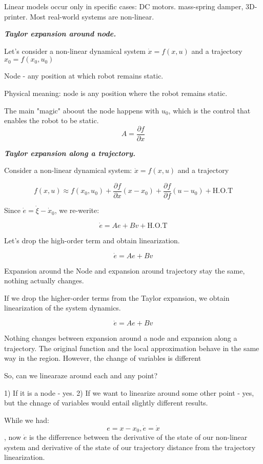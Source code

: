 Linear models occur only in specific cases: DC motors. mass-spring damper, 3D-printer.
Most real-world systems are non-linear. 

\textit{\textbf{Taylor expansion around node.}}

Let's consider a non-linear dynamical system $\dot x = f(x, u)$ and a trajectory $x_0 = f(x_0, u_0)$

Node - any position at which robot remains static. 

Physical meaning: node is any position where the robot remains static.

The main "magic" aboout the node happens with $u_0$, which is the control that enables the robot to be static. 
\[A = \dfrac{\partial f}{\partial x}\]



\textit{\textbf{Taylor expansion along a trajectory.}}

Consider a non-linear dynamical system:
$\dot  x = f(x, u)$ and a trajectory

\[f(x, u) \approx f(x_0, u_0) + \dfrac{\partial f}{\partial x} (x - x_0) + \dfrac{\partial f}{\partial f} (u - u_0) + \text{H.O.T}\]

Since $\dot e = \dot \xi - \dot x_0$, we re-werite:

\[\dot e = Ae + Bv + \text{H.O.T}\]

Let's drop the high-order term and obtain linearization. 

\[\dot e = Ae + Bv\]

Expansion around the Node and expansion around trajectory stay the same, nothing actually changes. 



If we drop the higher-order terms from the Taylor expansion, we obtain linearization of the system dynamics. 

\[\dot e = Ae + Bv\]

Nothing changes between expansion around a node and expansion along a trajectory. 
The original function and the local approximation behave in the same way in the region.
However, the change of variables is different

So, can we linearaze around each and any point?

1) If it is a node - yes. 
2) If we want to linearize around some other point - yes, but the chnage of variables would entail slightly 
different results. 

While we had:
\[ e = x - x_0, \dot e = \dot x\], now
$\dot e$ is the differrence between the derivative of the state of our non-linear system and derivative of the state of our trajectory distance from the trajectory linearization.  

